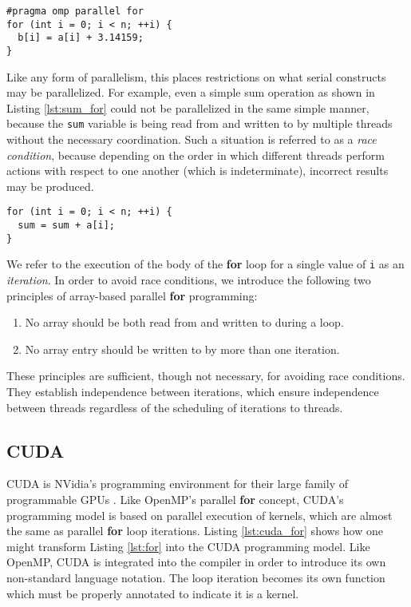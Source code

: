 \begin{lstlisting}[float,style=dan-style,caption=OpenMP parallel {\bf for} loop,label=lst:omp_for]
#pragma omp parallel for
for (int i = 0; i < n; ++i) {
  b[i] = a[i] + 3.14159;
}
\end{lstlisting}

Like any form of parallelism, this places restrictions on what serial
constructs may be parallelized.
For example, even a simple sum operation as shown in Listing \ref{lst:sum_for}
could not be parallelized in the same simple manner, because the {\tt sum} variable
is being read from and written to by multiple threads without the necessary coordination.
Such a situation is referred to as a \emph{race condition}, because depending on the
order in which different threads perform actions with respect to one another (which is indeterminate),
incorrect results may be produced.

\begin{lstlisting}[float,style=dan-style,caption=Dependent {\bf for} loop,label=lst:sum_for]
for (int i = 0; i < n; ++i) {
  sum = sum + a[i];
}
\end{lstlisting}

We refer to the execution of the body of the {\bf for} loop for a single
value of {\tt i} as an \emph{iteration}.
In order to avoid race conditions, we introduce the following two principles of
array-based parallel {\bf for} programming:

\begin{enumerate}
\item No array should be both read from and written to during a loop.
\item No array entry should be written to by more than one iteration.
\end{enumerate}

These principles are sufficient, though not necessary, for avoiding race conditions.
They establish independence between iterations, which ensure independence
between threads regardless of the scheduling of iterations to threads.

\subsection{CUDA}
\label{sec:cuda}

CUDA is NVidia's programming environment for their large family of programmable GPUs \cite{nickolls2008scalable}.
Like OpenMP's parallel {\bf for} concept, CUDA's programming model is based on parallel execution
of kernels, which are almost the same as parallel {\bf for} loop iterations.
Listing \ref{lst:cuda_for} shows how one might transform Listing \ref{lst:for} into
the CUDA programming model.
Like OpenMP, CUDA is integrated into the compiler in order to introduce its own
non-standard language notation.
The loop iteration becomes its own function which must be properly annotated
to indicate it is a kernel.

